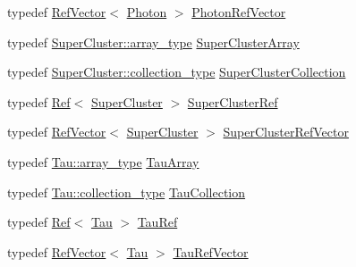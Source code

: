 \begin{DoxyCompactItemize}
\item 
typedef \hyperlink{classpanda_1_1RefVector}{RefVector}$<$ \hyperlink{classpanda_1_1Photon}{Photon} $>$ \hyperlink{namespacepanda_a553f3eb1953907a832ad9cf33d2a0c7b}{PhotonRefVector}
\item 
typedef \hyperlink{classpanda_1_1Array}{SuperCluster::array\_\-type} \hyperlink{namespacepanda_a1f0062e89c52b348cee00a27920fb35c}{SuperClusterArray}
\item 
typedef \hyperlink{classpanda_1_1Collection}{SuperCluster::collection\_\-type} \hyperlink{namespacepanda_a4821dea82b397c66d9e9d4df54e10eb2}{SuperClusterCollection}
\item 
typedef \hyperlink{classpanda_1_1Ref}{Ref}$<$ \hyperlink{classpanda_1_1SuperCluster}{SuperCluster} $>$ \hyperlink{namespacepanda_ab1e86cf8d341c37880269572ab447764}{SuperClusterRef}
\item 
typedef \hyperlink{classpanda_1_1RefVector}{RefVector}$<$ \hyperlink{classpanda_1_1SuperCluster}{SuperCluster} $>$ \hyperlink{namespacepanda_aa60eddc3c2149493db37c9984a52395f}{SuperClusterRefVector}
\item 
typedef \hyperlink{classpanda_1_1Array}{Tau::array\_\-type} \hyperlink{namespacepanda_ac9df7e06c1479da7e998d1e8542490fa}{TauArray}
\item 
typedef \hyperlink{classpanda_1_1Collection}{Tau::collection\_\-type} \hyperlink{namespacepanda_a4af7b5c7acf5a2c804cabb3e08ea5b8e}{TauCollection}
\item 
typedef \hyperlink{classpanda_1_1Ref}{Ref}$<$ \hyperlink{classpanda_1_1Tau}{Tau} $>$ \hyperlink{namespacepanda_aa3bb14459c0d3bdcebf8e232b988340f}{TauRef}
\item 
typedef \hyperlink{classpanda_1_1RefVector}{RefVector}$<$ \hyperlink{classpanda_1_1Tau}{Tau} $>$ \hyperlink{namespacepanda_a4887667837e56b43adcea0e5f59eb72c}{TauRefVector}
\end{DoxyCompactItemize}
